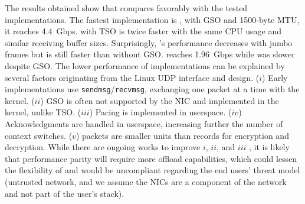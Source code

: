The results obtained show that \tcpls compares favorably
with the tested \quic implementations. The fastest \quic implementation is
\quicly, with GSO and 1500-byte MTU, it reaches 4.4~Gbps. \tcpls with TSO is 
twice faster with the same CPU usage and similar 
receiving buffer sizes. Surprisingly, \quicly's performance decreases with
jumbo frames but is still faster than without GSO.  \msquic reaches
1.96~Gbps while \mvfst was slower despite GSO. 
The lower performance of \quic implementations can be explained by several 
factors originating from the Linux UDP interface and \quic design.
($i$) Early \quic implementations use \texttt{sendmsg}/\texttt{recvmsg}, 
exchanging one packet at a time with the kernel.
($ii$) GSO is often not supported by the NIC and implemented in the kernel, 
unlike TSO.
($iii$) Pacing is implemented in userspace.
($iv$) Acknowledgments are handled in userspace, increasing further the number 
of context switches.
($v$) \quic packets are smaller units than \tls records for encryption and 
decryption.
While there are ongoing works to improve $i$, $ii$, and $iii$ 
\cite{udp-gso-pacing}, it is likely that 
performance parity will require more offload capabilities, which could lessen 
the flexibility of \quic and would be uncompliant regarding the end users' 
threat model 
(untrusted network, and we assume the NICs are a component of the network and 
not part of the user's stack).




